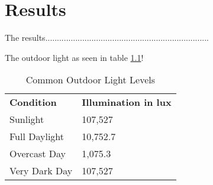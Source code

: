	\chapter{Results}

The results.......................................................................
\bigbreak


The outdoor light as seen in table \ref{outLight}! 

\vspace{5 mm}

\setlength{\tabcolsep}{10pt}
\renewcommand{\arraystretch}{1.5}
{

\begin{table}[h!]
\centering
\begin{tabular}{ |p{4cm}|p{4cm}|  }
 \hline
 \rowcolor{lightgray} \multicolumn{2}{|c|}{{\bf Common Light Levels Outdoor - Daytime}} \\
 \hline
{\bf Condition} & {\bf Illumination in lux}\\
 \hline
 Sunlight   		& 107,527\\
 Full Daylight   	& 10,752.7\\
 Overcast Day	& 1,075.3\\
 Very Dark Day	& 107,527\\
 \hline
\end{tabular}
\caption{Common Outdoor Light Levels}
\label{outLight}
\end{table}


\begin{adjustbox}{width=\textwidth}
\end{adjustbox}




}
